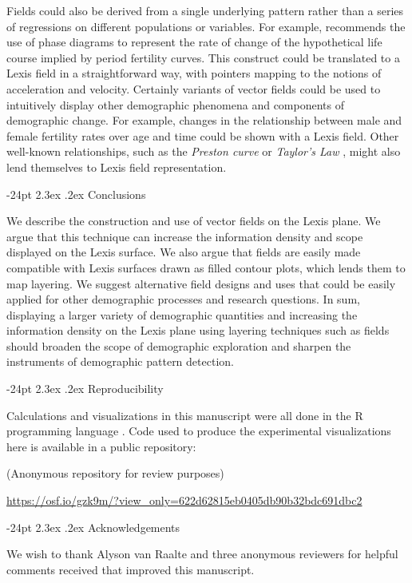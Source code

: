 \documentclass[10pt, twoside, parskip=half]{article}
\makeatletter
\renewcommand\section{\@startsection {section}{1}{\z@}%
                                   {-24pt}%
                                   {2.3ex \@plus.2ex}%
                                   {\normalfont\large\bfseries}}
\makeatother
\begin{document}
Fields could also be derived from a single underlying pattern rather than a series of regressions on different populations or variables. For example, \citet{shang2018visualizing} recommends the use of phase diagrams to represent the rate of change of the hypothetical life course implied by period fertility curves. This construct could be translated to a Lexis field in a straightforward way, with pointers mapping to the notions of acceleration and velocity. Certainly variants of vector fields could be used to intuitively display other demographic phenomena and components of demographic change. For example, changes in the relationship between male and female fertility rates over age and time could be shown with a Lexis field. Other well-known relationships, such as the \emph{Preston curve} \citep{preston1975changing} or \emph{Taylor's Law} \citep{cohen2018gompertz}, might also lend themselves to Lexis field representation.

\hypertarget{conclusions}{%
\section{Conclusions}\label{conclusions}}

We describe the construction and use of vector fields on the Lexis plane. We argue that this technique can increase the information density and scope displayed on the Lexis surface. We also argue that fields are easily made compatible with Lexis surfaces drawn as filled contour plots, which lends them to map layering. We suggest alternative field designs and uses that could be easily applied for other demographic processes and research questions. In sum, displaying a larger variety of demographic quantities and increasing the information density on the Lexis plane using layering techniques such as fields should broaden the scope of demographic exploration and sharpen the instruments of demographic pattern detection.

\hypertarget{reproducibility}{%
\section{Reproducibility}\label{reproducibility}}

Calculations and visualizations in this manuscript were all done in the R programming language \citep{R}. Code used to produce the experimental visualizations here is available in a public repository:

(Anonymous repository for review purposes)

\url{https://osf.io/gzk9m/?view_only=622d62815eb0405db90b32bdc691dbc2}

\hypertarget{acknowledgements}{%
\section{Acknowledgements}\label{acknowledgements}}

We wish to thank Alyson van Raalte and three anonymous reviewers for helpful comments received that improved this manuscript.

\clearpage

\newpage


\end{document}
